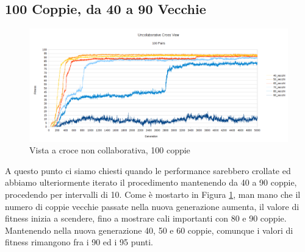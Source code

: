 \subsection{100 Coppie, da 40 a 90 Vecchie}
\begin{figure}[ht]
	\centering
	\includegraphics[scale=0.7,angle=90]{imgs/uncollaborative_cross_100_pairs_40_90_vecchi.png}
	\caption{Vista a croce non collaborativa, 100 coppie}
	\label{figure:uncoll_cross_100_40_90}
\end{figure}
A questo punto ci siamo chiesti quando le performance sarebbero crollate ed
abbiamo ulteriormente iterato il procedimento mantenendo da 40 a 90 coppie,
procedendo per intervalli di 10. Come è mostarto in Figura
\ref{figure:uncoll_cross_100_40_90}, man mano che il numero di coppie vecchie
passate nella nuova generazione aumenta, il valore di fitness inizia a scendere,
fino a mostrare cali importanti con 80 e 90 coppie. Mantenendo nella nuova
generazione 40, 50 e 60 coppie, comunque i valori di fitness rimangono fra i 90
ed i 95 punti.

\clearpage

